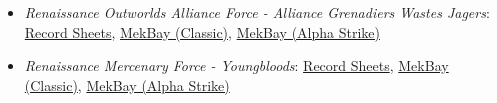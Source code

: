 \begin{itemize}
\item \emph{Renaissance Outworlds Alliance Force - Alliance Grenadiers Wastes Jagers}: \href{https://raw.githubusercontent.com/Eudicods/outworlds-alliance/rules-pdf/outworlds-wastes.pdf}{Record Sheets}, \href{https://mekbay.com/?units=Outworlds%20Wastes~BMMerlin_MLN1A,BMMerlin_MLN1A,BMLocust_LCT3V,BMLocust_LCT1V,BMStinger_STG3G,BMStinger_STG3R,BMWasp_WSP1A,BMWasp_WSP1A,AFShilone_SL17,AFLightning_LTNG15,CVWarriorAttackHelicopter_H7C,CVWarriorAttackHelicopter_H7A,CVKarnovURTransport,CVKarnovURTransport,CVMobileLongTomArtillery_LTMOB25,CVThumperArtilleryVehicle,CIHALOParatrooper_LyranParatrooperCorps:4:8,CIHALOParatrooper_LyranParatrooperCorps:4:8,CIHALOParatrooper_LyranParatrooperCorps:4:8&name=Alliance%20Grenadiers%20Wastes%20Jagers&gs=cbt}{MekBay (Classic)}, \href{https://mekbay.com/?units=Outworlds%20Wastes~BMMerlin_MLN1A,BMMerlin_MLN1A,BMLocust_LCT3V,BMLocust_LCT1V,BMStinger_STG3G,BMStinger_STG3R,BMWasp_WSP1A,BMWasp_WSP1A,AFShilone_SL17,AFLightning_LTNG15,CVWarriorAttackHelicopter_H7C,CVWarriorAttackHelicopter_H7A,CVKarnovURTransport,CVKarnovURTransport,CVMobileLongTomArtillery_LTMOB25,CVThumperArtilleryVehicle,CIHALOParatrooper_LyranParatrooperCorps:4:8,CIHALOParatrooper_LyranParatrooperCorps:4:8,CIHALOParatrooper_LyranParatrooperCorps:4:8&name=Alliance%20Grenadiers%20Wastes%20Jagers&gs=as}{MekBay (Alpha Strike)}

\item \emph{Renaissance Mercenary Force - Youngbloods}: \href{https://raw.githubusercontent.com/Eudicods/outworlds-wastes/rules-pdf/youngbloods.pdf}{Record Sheets}, \href{https://mekbay.com/?units=Outworlds%20Wastes~BMThunderbolt_TDR5S,BMWolverine_WVR6R,BMPhoenixHawk_PXH1,BMCatapult_CPLTC1,BMShadowHawk_SHD2H,BMCommando_COM2D,BMLocust_LCT3V,CVBulldogMediumTank,CVBulldogMediumTank,CVPegasusScoutHoverTank,CVMaximHeavyHoverTransport,CIFootPlatoonAntiMech_Rifle,CIFootPlatoonAntiMech_SRM&name=Youngbloods&gs=cbt}{MekBay (Classic)}, \href{https://mekbay.com/?units=Outworlds%20Wastes~BMThunderbolt_TDR5S,BMWolverine_WVR6R,BMPhoenixHawk_PXH1,BMCatapult_CPLTC1,BMShadowHawk_SHD2H,BMCommando_COM2D,BMLocust_LCT3V,CVBulldogMediumTank,CVBulldogMediumTank,CVPegasusScoutHoverTank,CVMaximHeavyHoverTransport,CIFootPlatoonAntiMech_Rifle,CIFootPlatoonAntiMech_SRM&name=Youngbloods&gs=as}{MekBay (Alpha Strike)}


\end{itemize}
